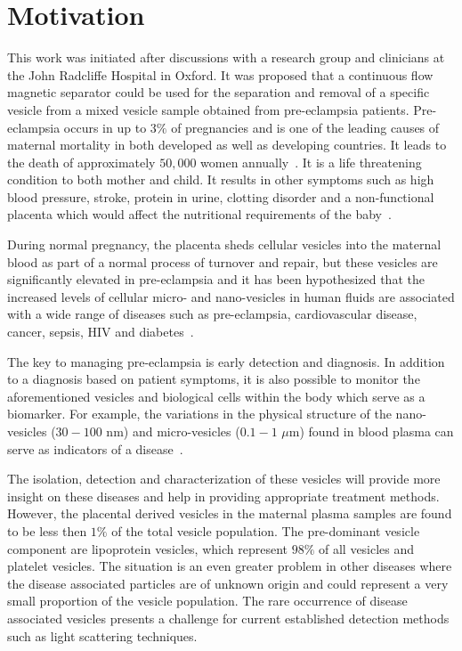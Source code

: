 \section{Motivation}\label{sec:motivation}
This work was initiated after discussions with a research group and clinicians at the John Radcliffe Hospital in Oxford. It was proposed that a continuous flow magnetic separator could be used for the separation and removal of a specific vesicle from a mixed vesicle sample obtained from pre-eclampsia patients. Pre-eclampsia occurs in up to $3\%$ of pregnancies and is one of the leading causes of maternal mortality in both developed as well as developing countries. It leads to the death of approximately $50,000$ women annually~\cite{Redman2005}. It is a life threatening condition to both mother and child. It results in other symptoms such as high blood pressure, stroke, protein in urine, clotting disorder and a non-functional placenta which would affect the nutritional requirements of the baby~\cite{Redman2005,Calvert2012}.

During normal pregnancy, the placenta sheds cellular vesicles into the maternal blood as part of a normal process of turnover and repair, but these vesicles are significantly elevated in pre-eclampsia and it has been hypothesized that the increased levels of cellular micro- and nano-vesicles in human fluids are associated with a wide range of diseases such as pre-eclampsia, cardiovascular disease, cancer, sepsis, HIV and diabetes~\cite{Sargent2014}.

The key to managing pre-eclampsia is early detection and diagnosis. In addition to a diagnosis based on patient symptoms, it is also possible to monitor the aforementioned vesicles and biological cells within the body which serve as a biomarker. For example, the variations in the physical structure of the nano-vesicles ($30-100$ nm) and micro-vesicles ($0.1-1$ $\mu$m) found in blood plasma can serve as indicators of a disease~\cite{Sargent2014}.

The isolation, detection and characterization of these vesicles will provide more insight on these diseases and help in providing appropriate treatment methods. However, the placental derived vesicles in the maternal plasma samples are found to be less then $1\%$ of the total vesicle population. The pre-dominant vesicle component are lipoprotein vesicles, which represent $98\%$ of all vesicles and platelet vesicles. The situation is an even greater problem in other diseases where the disease associated particles are of unknown origin and could represent a very small proportion of the vesicle population. The rare occurrence of disease associated vesicles presents a challenge for current established detection methods such as light scattering techniques.

